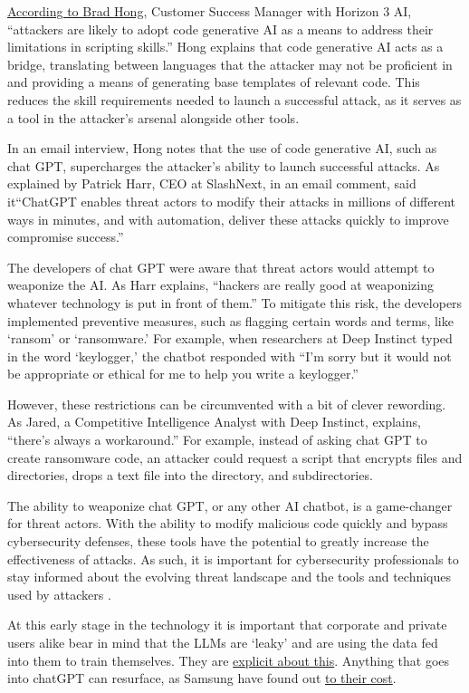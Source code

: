 \href{https://securityintelligence.com/news/are-threat-actors-using-chatgpt-to-hack-your-network/}{According to Brad Hong}, Customer Success Manager with Horizon 3 AI, ``attackers are likely to adopt code generative AI as a means to address their limitations in scripting skills.'' Hong explains that code generative AI acts as a bridge, translating between languages that the attacker may not be proficient in and providing a means of generating base templates of relevant code. This reduces the skill requirements needed to launch a successful attack, as it serves as a tool in the attacker's arsenal alongside other tools.\par
In an email interview, Hong notes that the use of code generative AI, such as chat GPT, supercharges the attacker's ability to launch successful attacks. As explained by Patrick Harr, CEO at SlashNext, in an email comment, said it{``ChatGPT enables threat actors to modify their attacks in millions of different ways in minutes, and with automation, deliver these attacks quickly to improve compromise success.''}\par
The developers of chat GPT were aware that threat actors would attempt to weaponize the AI. As Harr explains, ``hackers are really good at weaponizing whatever technology is put in front of them.'' To mitigate this risk, the developers implemented preventive measures, such as flagging certain words and terms, like `ransom' or `ransomware.' For example, when researchers at Deep Instinct typed in the word `keylogger,' the chatbot responded with ``I'm sorry but it would not be appropriate or ethical for me to help you write a keylogger.''\par
However, these restrictions can be circumvented with a bit of clever rewording. As Jared, a Competitive Intelligence Analyst with Deep Instinct, explains, ``there's always a workaround.'' For example, instead of asking chat GPT to create ransomware code, an attacker could request a script that encrypts files and directories, drops a text file into the directory, and subdirectories.\par
The ability to weaponize chat GPT, or any other AI chatbot, is a game-changer for threat actors. With the ability to modify malicious code quickly and bypass cybersecurity defenses, these tools have the potential to greatly increase the effectiveness of attacks. As such, it is important for cybersecurity professionals to stay informed about the evolving threat landscape and the tools and techniques used by attackers \cite{brundage2018malicious}.\par 
At this early stage in the technology it is important that corporate and private users alike bear in mind that the LLMs are `leaky' and are using the data fed into them to train themselves. They are \href{https://help.openai.com/en/articles/6783457-chatgpt-general-faq}{explicit about this}. Anything that goes into chatGPT can resurface, as Samsung have found out \href{https://cybernews.com/news/chatgpt-samsung-data-leak/}{to their cost}.
